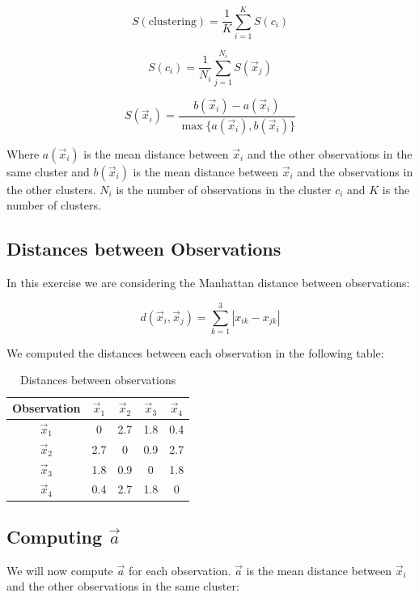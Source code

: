 \documentclass{article}
\begin{document}
\[ S(\text{clustering}) = \frac{1}{K} \sum_{i=1}^K S(c_i) \]

\[ S(c_i) = \frac{1}{N_i} \sum_{j=1}^{N_i} S(\vec{x}_j) \]

\[ S(\vec{x}_i) = \frac{b(\vec{x}_i) - a(\vec{x}_i)}{\max \{ a(\vec{x}_i), b(\vec{x}_i) \}} \]

Where $a(\vec{x}_i)$ is the mean distance between $\vec{x}_i$ and the other observations in the same cluster and $b(\vec{x}_i)$ is the mean distance between $\vec{x}_i$ and the observations in the other clusters. $N_i$ is the number of observations in the cluster $c_i$ and $K$ is the number of clusters.

\subsection*{Distances between Observations}

In this exercise we are considering the Manhattan distance between observations:

\[ d(\vec{x}_i, \vec{x}_j) = \sum_{k=1}^3 |x_{ik} - x_{jk}| \]

We computed the distances between each observation in the following table:

\begin{table}[h!]
  \centering
  \begin{tabular}{c|c|c|c|c}
    Observation & $\vec{x}_1$ & $\vec{x}_2$ & $\vec{x}_3$ & $\vec{x}_4$ \\ \hline
    $\vec{x}_1$ & 0 & 2.7 & 1.8 & 0.4 \\ \hline
    $\vec{x}_2$ & 2.7 & 0 & 0.9 & 2.7 \\ \hline
    $\vec{x}_3$ & 1.8 & 0.9 & 0 & 1.8 \\ \hline
    $\vec{x}_4$ & 0.4 & 2.7 & 1.8 & 0 \\ 
  \end{tabular}
  \caption{Distances between observations}
  \label{tab:distances}
\end{table}

\subsection*{Computing $\vec{a}$}

We will now compute $\vec{a}$ for each observation. $\vec{a}$ is the mean distance between $\vec{x}_i$ and the other observations in the same cluster:
\end{document}

